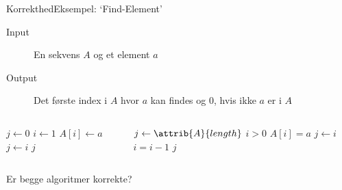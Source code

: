 \documentclass[aspectratio=1610]{beamer}
\begin{document}
\begin{frame}{Korrekthed}{Eksempel: `Find-Element'}
    \begin{description}
        \item[Input] En sekvens $A$ og et element $a$
        \item[Output] Det første index i $A$ hvor $a$ kan findes og 0, hvis ikke
            $a$ er i $A$
    \end{description}

    \pause
    \begin{columns}

        \begin{codebox}
            \li $j \gets 0$
            \li \For $i \gets 1$ \To {} \Do
                \li \If $A[i] \gets a$ \Then
                    \li $j \gets i$
                \End
            \End
            \li \Return $j$
        \end{codebox}



        \begin{codebox}
            \li $j \gets \attrib{A}{length}$
            \li \While $i > 0$ \Do
                \li \If $A[i] = a$ \Then
                    \li $j \gets i$
                \End
                \li $i = i - 1$
            \End
            \li \Return $j$
        \end{codebox}


    \end{columns}

    \medskip
    Er begge algoritmer korrekte? 
\end{frame}
\end{document}
